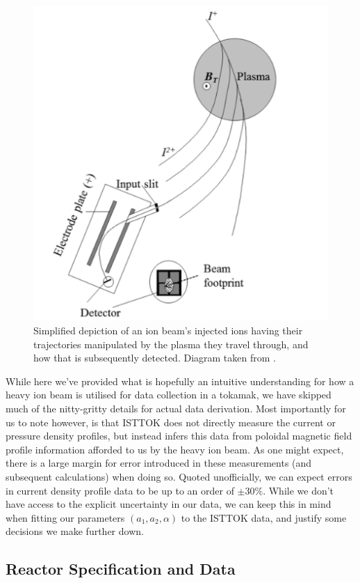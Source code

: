 \begin{figure}[h!]
    \centering
    \includegraphics[scale=0.8]{imgs/c5/ion-diagnostics.png}
    \caption{Simplified depiction of an ion beam's injected ions having their trajectories manipulated by the plasma they travel through, and how that is 
    subsequently detected. Diagram taken from \cite{ion-beam-diagnostics}.}
    \label{heavy-ion-beam}
\end{figure}

While here we've provided what is hopefully an intuitive understanding for how a heavy ion beam is utilised for data 
collection in a tokamak, we have skipped much of the nitty-gritty details for actual data derivation. Most importantly for us to note
however, is that ISTTOK does not directly measure the current or pressure density profiles, but instead 
infers this data from poloidal magnetic field profile information afforded to us by the heavy ion beam. 
As one might expect, there is a large margin for 
error introduced in these measurements (and subsequent calculations) when doing so. Quoted unofficially, we can expect errors in 
current density profile data to be up to an order of $\pm30\%$. While we don't have access to the explicit uncertainty in our data, we can keep this in mind when 
fitting our parameters $(a_1, a_2, \alpha)$ to the ISTTOK data, and justify some decisions we make further down.

\subsection{Reactor Specification and Data}

